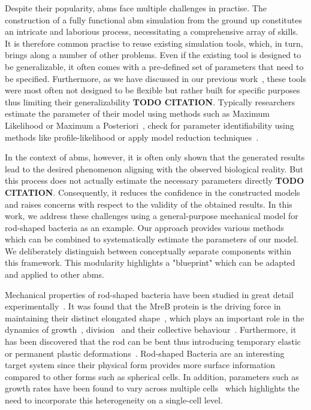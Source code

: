 \documentclass{article}
\begin{document}
Despite their popularity, \acp{abm} face multiple challenges in practise.
The construction of a fully functional \ac{abm} simulation from the ground up constitutes an
intricate and laborious process, necessitating a comprehensive array of skills. It is therefore
common practise to reuse existing simulation tools, which, in turn, brings along a number of
other problems.
Even if the existing tool is designed to be generalizable, it often comes with a pre-defined set
of parameters that need to be specified.
Furthermore, as we have discussed in our previous work~\cite{Pleyer2023}, these tools were most
often not designed to be flexible but rather built for specific purposes thus limiting their
generalizability \textbf{TODO CITATION}.
Typically researchers estimate the parameter of their model using methods such as Maximum Likelihood
or Maximum a Posteriori~\cite{Gbor2015,Banga2008,Ashyraliyev2009}, check for parameter
identifiability using methods like profile-likelihood or apply model reduction
techniques~\cite{Kreutz2013,Raue2014,Simpson2025}.

In the context of \acp{abm}, however, it is often only shown that the generated results lead to the
desired phenomenon aligning with the observed biological reality.
But this process does not actually estimate the necessary parameters directly \textbf{TODO CITATION}.
Consequently, it reduces the confidence in the constructed models and raises concerns with respect
to the validity of the obtained results.
In this work, we address these challenges using a general-purpose mechanical model for rod-shaped
bacteria as an example.
Our approach provides various methods which can be combined to systematically estimate the
parameters of our model. We deliberately distinguish between conceptually separate components within
this framework.
This modularity highlights a "blueprint" which can be adapted and applied to other \acp{abm}.

Mechanical properties of rod-shaped bacteria have been studied in great detail
experimentally~\cite{Chatterjee1988,Takeuchi2005,IWAI2002}.
It was found that the MreB protein is the driving force in maintaining their distinct elongated
shape~\cite{Ursell2014}, which plays an important role in the dynamics of
growth~\cite{Billaudeau2017}, division~\cite{Harry2001} and their collective
behaviour~\cite{vanGestel2015,Balagam2015}.
Furthermore, it has been discovered that the rod can be bent thus introducing temporary elastic or
permanent plastic deformations~\cite{Amir2014_2}.
Rod-shaped Bacteria are an interesting target system since their physical form provides more surface
information compared to other forms such as spherical cells.
In addition, parameters such as growth rates have been found to vary across multiple
cells~\cite{Koutsoumanis2013} which highlights the need to incorporate this heterogeneity on a
single-cell level.
\end{document}
